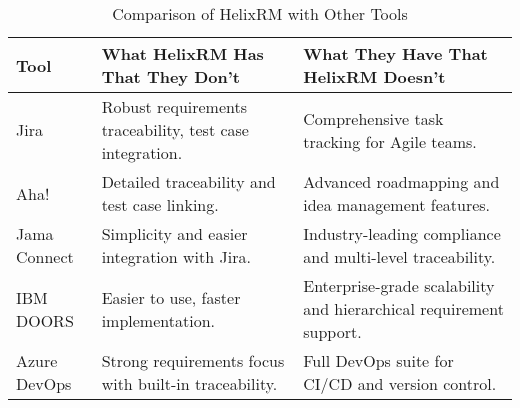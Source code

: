 \begin{table}[H]
    \centering
    \begin{tabular}{p{1cm}p{3.1cm}p{3.1cm}}
        \toprule
        \textbf{Tool} & \textbf{What HelixRM Has That They Don’t} & \textbf{What They Have That HelixRM Doesn’t} \\
        \midrule
        Jira & Robust requirements traceability, test case integration. & Comprehensive task tracking for Agile teams. \\
        Aha! & Detailed traceability and test case linking. & Advanced roadmapping and idea management features. \\
        Jama Connect & Simplicity and easier integration with Jira. & Industry-leading compliance and multi-level traceability. \\
        IBM DOORS & Easier to use, faster implementation. & Enterprise-grade scalability and hierarchical requirement support. \\
        Azure DevOps & Strong requirements focus with built-in traceability. & Full DevOps suite for CI/CD and version control. \\
        \bottomrule
    \end{tabular}
    \vspace{5pt}
    \caption{Comparison of HelixRM with Other Tools}
    \label{tab:helix-vs-all}
\end{table}
